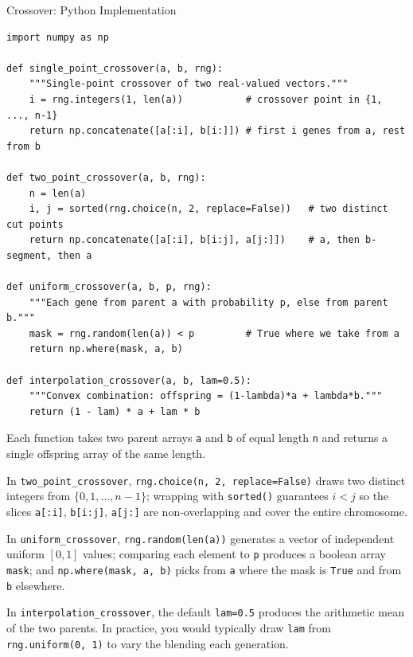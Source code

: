 \documentclass[aspectratio=169,10pt]{beamer}
\begin{document}
\begin{frame}[fragile]{Crossover: Python Implementation}
\begin{lstlisting}[style=python, caption={Four crossover operators (Python / NumPy)}]
import numpy as np

def single_point_crossover(a, b, rng):
    """Single-point crossover of two real-valued vectors."""
    i = rng.integers(1, len(a))           # crossover point in {1, ..., n-1}
    return np.concatenate([a[:i], b[i:]]) # first i genes from a, rest from b

def two_point_crossover(a, b, rng):
    n = len(a)
    i, j = sorted(rng.choice(n, 2, replace=False))   # two distinct cut points
    return np.concatenate([a[:i], b[i:j], a[j:]])    # a, then b-segment, then a

def uniform_crossover(a, b, p, rng):
    """Each gene from parent a with probability p, else from parent b."""
    mask = rng.random(len(a)) < p         # True where we take from a
    return np.where(mask, a, b)

def interpolation_crossover(a, b, lam=0.5):
    """Convex combination: offspring = (1-lambda)*a + lambda*b."""
    return (1 - lam) * a + lam * b
\end{lstlisting}

  Each function takes two parent arrays \texttt{a} and \texttt{b} of
  equal length \texttt{n} and returns a single offspring array of the
  same length.

  In \texttt{two\_point\_crossover}, \texttt{rng.choice(n, 2, replace=False)}
  draws two distinct integers from $\{0, 1, \ldots, n-1\}$; wrapping
  with \texttt{sorted()} guarantees $i < j$ so the slices
  \texttt{a[:i]}, \texttt{b[i:j]}, \texttt{a[j:]} are non-overlapping
  and cover the entire chromosome.

  In \texttt{uniform\_crossover}, \texttt{rng.random(len(a))} generates
  a vector of independent uniform $[0,1]$ values; comparing each
  element to \texttt{p} produces a boolean array \texttt{mask}; and
  \texttt{np.where(mask, a, b)} picks from \texttt{a} where the mask
  is \texttt{True} and from \texttt{b} elsewhere.

  In \texttt{interpolation\_crossover}, the default \texttt{lam=0.5}
  produces the arithmetic mean of the two parents.  In practice, you
  would typically draw \texttt{lam} from \texttt{rng.uniform(0, 1)}
  to vary the blending each generation.

\end{frame}
\end{document}
